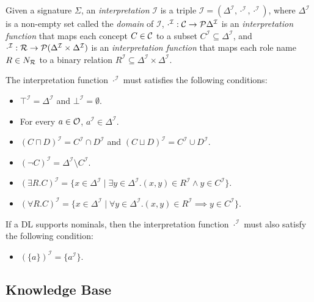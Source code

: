 \begin{definition}[Interpretation]
    Given a signature $\Sigma$, an \emph{interpretation} $\mathcal{I}$ is a triple $\mathcal{I} = (\Delta^\mathcal{I}, \cdot^\mathcal{I}, \cdot^\mathcal{I})$,
    where $\Delta^\mathcal{I}$ is a non-empty set called the \emph{domain} of $\mathcal{I}$,
    $\cdot^\mathcal{I}:\mathcal{C}\to\mathcal{P}\Delta^\mathcal{I}$ is 
    an \emph{interpretation function} that maps each concept $C \in \mathcal{C}$ to a subset 
    $C^\mathcal{I} \subseteq \Delta^\mathcal{I}$,
    and $\cdot^\mathcal{I}:\mathcal{R}\to\mathcal{P}(\Delta^\mathcal{I}\times\Delta^\mathcal{I})$ is
    an \emph{interpretation function} that maps each role name $R \in N_{\mathcal{R}}$ to a binary relation $R^\mathcal{I} \subseteq \Delta^\mathcal{I} \times \Delta^\mathcal{I}$.

    The interpretation function $\cdot^\mathcal{I}$ must satisfies the following conditions:
    \begin{itemize}
        \item $\top^\mathcal{I} = \Delta^\mathcal{I}$ and $\bot^\mathcal{I} = \emptyset$.
        \item For every $a \in \mathcal{O}$, $a^\mathcal{I} \in \Delta^\mathcal{I}$.
        \item $(C \sqcap D)^\mathcal{I} = C^\mathcal{I} \cap D^\mathcal{I}$ and $(C \sqcup D)^\mathcal{I} = C^\mathcal{I} \cup D^\mathcal{I}$.
        \item $(\neg C)^\mathcal{I} = \Delta^\mathcal{I} \setminus C^\mathcal{I}$.
        \item $(\exists R.C)^\mathcal{I} = \{x \in \Delta^\mathcal{I} \mid \exists y \in \Delta^\mathcal{I}.(x, y) \in R^\mathcal{I} \land y \in C^\mathcal{I}\}$.
        \item $(\forall R.C)^\mathcal{I} = \{x \in \Delta^\mathcal{I} \mid \forall y \in \Delta^\mathcal{I}.(x, y) \in R^\mathcal{I} \implies y \in C^\mathcal{I}\}$.
    \end{itemize}
\end{definition}

If a DL supports nominals, then the interpretation function $\cdot^\mathcal{I}$ must also satisfy the following condition:
\begin{itemize}
    \item $(\{a\})^\mathcal{I} = \{a^\mathcal{I}\}$.
\end{itemize}

\subsection{Knowledge Base}
\label{dl_syntax_semantics:subsection:dl_kb}


